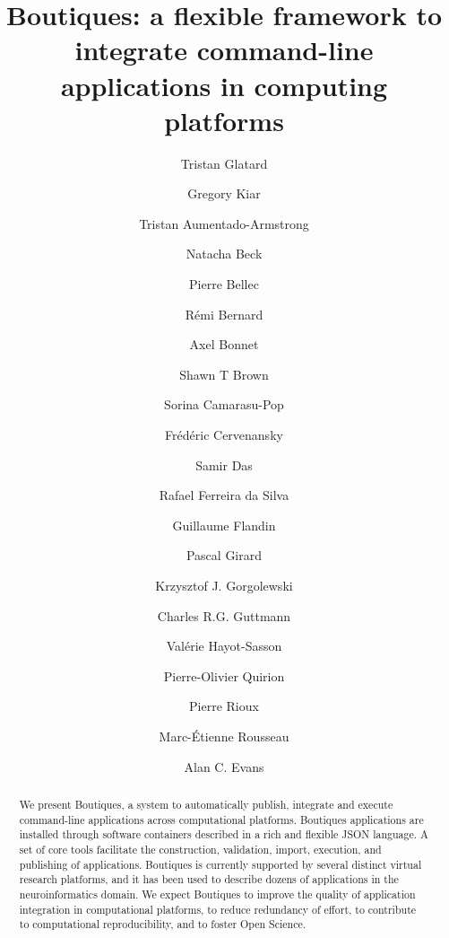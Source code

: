 \documentclass[a4paper,num-refs]{oup-contemporary}
\title{Boutiques: a flexible framework to integrate command-line applications in computing platforms}
\newcommand{\boutiques}{Boutiques\xspace}
\begin{document}
\author[1]{Tristan Glatard}
\author[2,3]{Gregory Kiar}
\author[2,3]{Tristan Aumentado-Armstrong}
\author[2,3]{Natacha Beck}
\author[4]{Pierre Bellec}
\author[2,3]{R\'emi Bernard}
\author[5]{Axel Bonnet}
\author[2,3]{Shawn T Brown}
\author[5]{Sorina Camarasu-Pop}
\author[5]{Fr\'ed\'eric Cervenansky}
\author[2,3]{Samir Das}
\author[6]{Rafael Ferreira da Silva}
\author[7]{Guillaume Flandin}
\author[5]{Pascal Girard}
\author[8]{Krzysztof J. Gorgolewski}
\author[9]{Charles R.G. Guttmann}
\author[1]{Val\'erie Hayot-Sasson}
\author[4]{Pierre-Olivier Quirion}
\author[2,3]{Pierre Rioux}
\author[10]{Marc-\'Etienne Rousseau}
\author[2,3]{Alan C. Evans}


\maketitle

\begin{abstract}
We present \boutiques, a system to automatically publish, integrate
and execute command-line applications across
computational platforms. \boutiques applications are installed through
software containers described in a rich and flexible JSON language. A
set of core tools facilitate the construction, validation, import,
execution, and publishing of applications. \boutiques is currently
supported by several distinct virtual research platforms, and it has
been used to describe dozens of applications in the neuroinformatics
domain. We expect \boutiques to improve the quality of application
integration in computational platforms, to reduce redundancy of
effort, to contribute to computational reproducibility, and to foster
Open Science.
\end{abstract}
\end{document}
